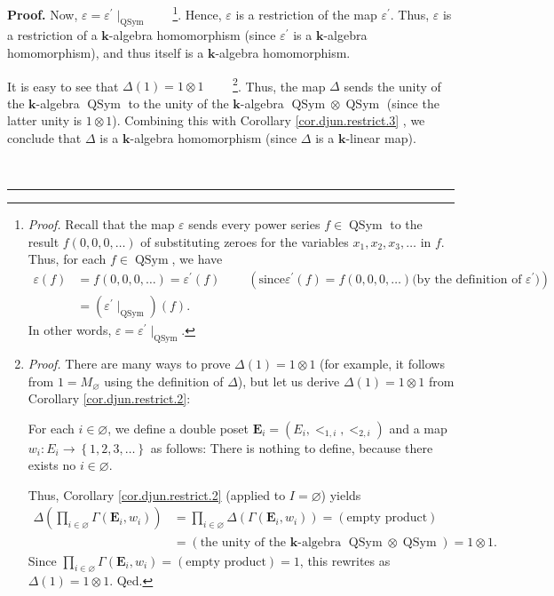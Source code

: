 \documentclass[numbers=enddot,12pt,final,onecolumn,notitlepage,abstracton]{scrartcl}
\theoremstyle{definition}
\newenvironment{proof}[1][Proof]{\noindent\textbf{#1.} }{\ \rule{0.5em}{0.5em}}
\let\prodnonlimits\prod
\renewcommand{\prod}{\prodnonlimits\limits}
\newenvironment{verlong}{}{}
\begin{document}
\begin{verlong}
\begin{footnotesize}
\begin{proof}
Now, $\varepsilon=\varepsilon^{\prime}\mid_{\operatorname*{QSym}}%
$\ \ \ \ \footnote{\textit{Proof.} Recall that the map $\varepsilon$ sends
every power series $f\in{\operatorname{QSym}}$ to the result $f\left(
0,0,0,\ldots\right)  $ of substituting zeroes for the variables $x_{1}%
,x_{2},x_{3},\ldots$ in $f$. Thus, for each $f\in\operatorname*{QSym}$, we
have%
\begin{align*}
\varepsilon\left(  f\right)   &  =f\left(  0,0,0,\ldots\right)  =\varepsilon
^{\prime}\left(  f\right)  \ \ \ \ \ \ \ \ \ \ \left(  \text{since
}\varepsilon^{\prime}\left(  f\right)  =f\left(  0,0,0,\ldots\right)  \text{
(by the definition of }\varepsilon^{\prime}\text{)}\right) \\
&  =\left(  \varepsilon^{\prime}\mid_{\operatorname*{QSym}}\right)  \left(
f\right)  .
\end{align*}
In other words, $\varepsilon=\varepsilon^{\prime}\mid_{\operatorname*{QSym}}%
$.}. Hence, $\varepsilon$ is a restriction of the map $\varepsilon^{\prime}$.
Thus, $\varepsilon$ is a restriction of a $\mathbf{k}$-algebra homomorphism
(since $\varepsilon^{\prime}$ is a $\mathbf{k}$-algebra homomorphism), and
thus itself is a $\mathbf{k}$-algebra homomorphism.

It is easy to see that $\Delta\left(  1\right)  =1\otimes1$%
\ \ \ \ \footnote{\textit{Proof.} There are many ways to prove $\Delta\left(
1\right)  =1\otimes1$ (for example, it follows from $1=M_{\varnothing}$ using
the definition of $\Delta$), but let us derive $\Delta\left(  1\right)
=1\otimes1$ from Corollary \ref{cor.djun.restrict.2}:
\par
For each $i\in\varnothing$, we define a double poset $\mathbf{E}_{i}=\left(
E_{i},<_{1,i},<_{2,i}\right)  $ and a map $w_{i}:E_{i}\rightarrow\left\{
1,2,3,\ldots\right\}  $ as follows: There is nothing to define, because there
exists no $i\in\varnothing$.
\par
Thus, Corollary \ref{cor.djun.restrict.2} (applied to $I=\varnothing$) yields
\begin{align*}
\Delta\left(  \prod_{i\in\varnothing}\Gamma\left(  \mathbf{E}_{i}%
,w_{i}\right)  \right)   &  =\prod_{i\in\varnothing}\Delta\left(
\Gamma\left(  \mathbf{E}_{i},w_{i}\right)  \right)  =\left(  \text{empty
product}\right) \\
&  =\left(  \text{the unity of the }\mathbf{k}\text{-algebra }%
\operatorname*{QSym}\otimes\operatorname*{QSym}\right)  =1\otimes1.
\end{align*}
Since $\prod_{i\in\varnothing}\Gamma\left(  \mathbf{E}_{i},w_{i}\right)
=\left(  \text{empty product}\right)  =1$, this rewrites as $\Delta\left(
1\right)  =1\otimes1$. Qed.}. Thus, the map $\Delta$ sends the unity of the
$\mathbf{k}$-algebra $\operatorname*{QSym}$ to the unity of the $\mathbf{k}%
$-algebra $\operatorname*{QSym}\otimes\operatorname*{QSym}$ (since the latter
unity is $1\otimes1$). Combining this with Corollary \ref{cor.djun.restrict.3}%
, we conclude that $\Delta$ is a $\mathbf{k}$-algebra homomorphism (since
$\Delta$ is a $\mathbf{k}$-linear map).


\end{proof}
\end{footnotesize}
\end{verlong}
\end{document}
